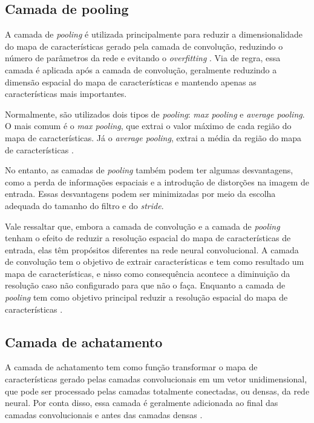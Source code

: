 \subsection{Camada de pooling}

A camada de \textit{pooling} é utilizada principalmente para reduzir a dimensionalidade do mapa de características gerado pela camada de convolução, reduzindo o número de parâmetros da rede e evitando o \textit{overfitting} \cite{lecun1998gradient}.
Via de regra, essa camada é aplicada após a camada de convolução, geralmente reduzindo a dimensão espacial do mapa de características e mantendo apenas as características mais importantes. 

Normalmente, são utilizados dois tipos de \textit{pooling}: \textit{max pooling} e \textit{average pooling}.
O mais comum é o \textit{max pooling}, que extrai o valor máximo de cada região do mapa de características.
Já o \textit{average pooling}, extrai a média da região do mapa de características \cite{sumitCNN}.


No entanto, as camadas de \textit{pooling} também podem ter algumas desvantagens, como a perda de informações espaciais e a introdução de distorções na imagem de entrada. 
Essas desvantagens podem ser minimizadas por meio da escolha adequada do tamanho do filtro e do \textit{stride}.

Vale ressaltar que, embora a camada de convolução e a camada de \textit{pooling} tenham o efeito de reduzir a resolução espacial do mapa de características de entrada, elas têm propósitos diferentes na rede neural convolucional.
A camada de convolução tem o objetivo de extrair características e tem como resultado um mapa de características, e nisso como consequência acontece a diminuição da resolução caso não configurado para que não o faça.
Enquanto a camada de \textit{pooling} tem como objetivo principal reduzir a resolução espacial do mapa de características \cite{divaSeg}.

\subsection{Camada de achatamento}

A camada de achatamento tem como função transformar o mapa de características gerado pelas camadas convolucionais em um vetor unidimensional, que pode ser processado pelas camadas totalmente conectadas, ou densas, da rede neural.
Por conta disso, essa camada é geralmente adicionada ao final das camadas convolucionais e antes das camadas densas \cite{lecun2015deep}.

